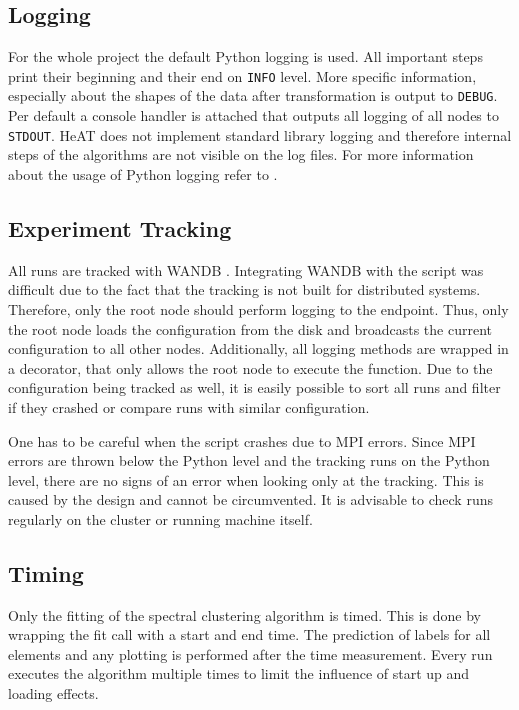 \subsection{Logging}
\label{subsec:logging}
For the whole project the default Python logging \cite{noauthor_pep_nodate} is used.
All important steps print their beginning and their end on \lstinline{INFO} level.
More specific information, especially about the shapes of the data after transformation is output to \lstinline{DEBUG}.
Per default a console handler is attached that outputs all logging of all nodes to \lstinline{STDOUT}.
\gls{HeAT} does not implement standard library logging and therefore internal steps of the algorithms are not visible on the log files.
For more information about the usage of Python logging refer to \cite{noauthor_pep_nodate}.


\subsection{Experiment Tracking}
\label{subsec:experiment_tracking}
All runs are tracked with \gls{WANDB} \cite{noauthor_weights_nodate}. Integrating \gls{WANDB} with the script was difficult due
to the fact that the tracking is not built for distributed systems. Therefore, only the root node should perform
logging to the endpoint.
Thus, only the root node loads the configuration from the disk and broadcasts the current configuration
to all other nodes.
Additionally, all logging methods are wrapped in a decorator, that only allows the root node to execute the function.
Due to the configuration being tracked as well, it is easily possible to sort all runs and filter if they crashed or
compare runs with similar configuration.

One has to be careful when the script crashes due to \gls{MPI} errors. Since \gls{MPI} errors are thrown
below the Python level and the tracking runs on the Python level, there are no signs of an error when looking only at
the tracking. This is caused by the design and cannot be circumvented. It is advisable to check runs regularly on
the cluster or running machine itself.

\subsection{Timing}
\label{subsec:timing}
Only the fitting of the spectral clustering algorithm is timed. This is done by wrapping the fit call with a start
and end time. The prediction of labels for all elements and any plotting is performed after the time measurement.
Every run executes the algorithm multiple times to limit the influence of start up and loading effects.

